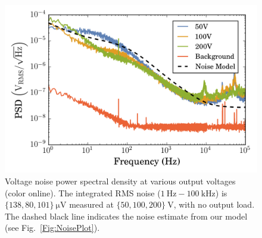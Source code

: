 \documentclass[aip,rsi,reprint]{revtex4-1} %
\begin{document}
\begin{figure}[t]
\includegraphics[width=\columnwidth]{fig/VoltagePSD.png}
\caption{Voltage noise power spectral density at various output voltages (color online). The integrated RMS noise ($\SI{1}{\hertz} - \SI{100}{\kilo\hertz}$) is $\{138, 80, 101\}~\si{\micro\volt}$ measured at  $\{50, 100, 200\}~\si{\volt}$, with no output load. The dashed black line indicates the noise estimate from our model (see Fig.~\ref{Fig:NoisePlot}).\label{Fig:PSD}}
\end{figure}
\end{document}
